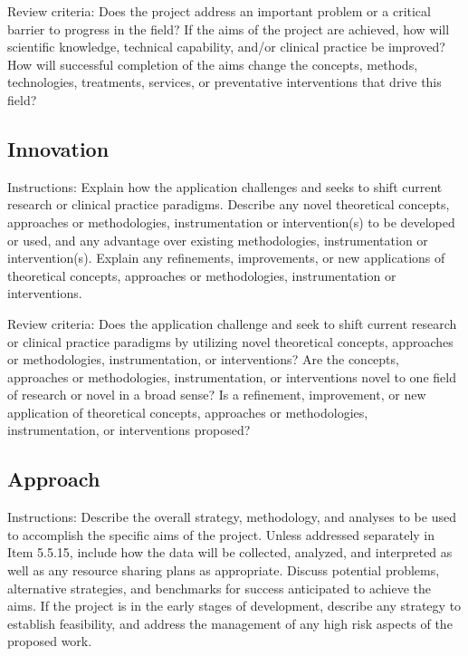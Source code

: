 \documentclass[12pt]{article}
\newcommand{\instructions}[1]{}
\renewcommand{\instructions}[1]{{\scriptsize \sc #1}}
\begin{document}
\instructions{ Review criteria: Does the project address an important
    problem or a critical barrier to progress in the field? If the
    aims of the project are achieved, how will scientific knowledge,
    technical capability, and/or clinical practice be improved? How
    will successful completion of the aims change the concepts,
    methods, technologies, treatments, services, or preventative
    interventions that drive this field?}

\subsection*{Innovation}

\instructions{ Instructions: Explain how the application challenges and
    seeks to shift current research or clinical practice paradigms.
    Describe any novel theoretical concepts, approaches or
    methodologies, instrumentation or intervention(s) to be developed
    or used, and any advantage over existing methodologies,
    instrumentation or intervention(s).  Explain any refinements,
    improvements, or new applications of theoretical concepts,
    approaches or methodologies, instrumentation or interventions.}

\instructions{ Review criteria: Does the application challenge and seek
    to shift current research or clinical practice paradigms by
    utilizing novel theoretical concepts, approaches or methodologies,
    instrumentation, or interventions? Are the concepts, approaches or
    methodologies, instrumentation, or interventions novel to one
    field of research or novel in a broad sense? Is a refinement,
    improvement, or new application of theoretical concepts,
    approaches or methodologies, instrumentation, or interventions
    proposed? }


\subsection*{Approach}

\instructions{ Instructions: Describe the overall strategy,
    methodology, and analyses to be used to accomplish the specific
    aims of the project. Unless addressed separately in Item 5.5.15,
    include how the data will be collected, analyzed, and interpreted
    as well as any resource sharing plans as appropriate.  Discuss
    potential problems, alternative strategies, and benchmarks for
    success anticipated to achieve the aims.  If the project is in the
    early stages of development, describe any strategy to establish
    feasibility, and address the management of any high risk aspects
    of the proposed work.}
\end{document}
